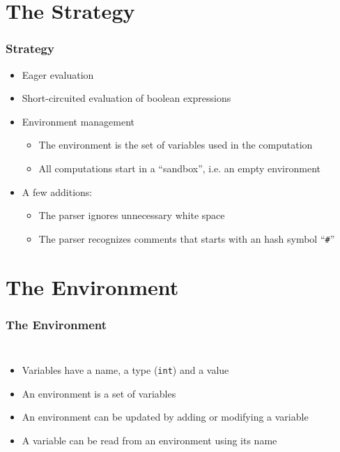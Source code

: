 \documentclass{beamer}
\begin{document}
\section{The Strategy}
\begin{frame}
\frametitle{Strategy}
\begin{itemize}
	\item Eager evaluation
	\item Short-circuited evaluation of boolean expressions
	\item Environment management
		\begin{itemize}
			\item The environment is the set of variables used in the
				computation
			\item All computations start in a ``sandbox'', i.e. an empty
				environment
		\end{itemize}
	\item A few additions:
		\begin{itemize}
			\item The parser ignores unnecessary white space
			\item The parser recognizes comments that starts with an hash
				symbol ``\texttt{\#}''
		\end{itemize}
\end{itemize}
\end{frame}

\section{The Environment}
\begin{frame}
	\frametitle{The Environment}
	\begin{columns}
		\small
		\begin{itemize}
			\item Variables have a name, a type (\texttt{int}) and a value
			\item An environment is a set of variables
			\item An environment can be updated by adding or modifying a
				variable
			\item A variable can be read from an environment using its name
		\end{itemize}
		
		
	\end{columns}
\end{frame}
\end{document}
